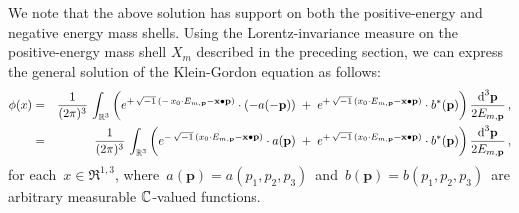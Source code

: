 We note that the above solution has support on {\color{red}both} the positive-energy and negative energy mass shells.
Using the Lorentz-invariance measure on the positive-energy mass shell $X_{m}$ described in the preceding section,
we can express the general solution of the Klein-Gordon equation as follows:
\begin{eqnarray*}
\phi(x)
& = &
	\dfrac{1}{(2\pi)^{3}}\,
	\int_{\Re^{3}} \left(
		e^{+\,\overset{{\color{white}.}}{\sqrt{-1}}\,
			({\color{red}-}\,x_{0} \cdot E_{m,\mathbf{p}} - \mathbf{x} \bullet \mathbf{p})
			}
		\cdot
		(-a(-\mathbf{p}))
		\; + \;
		e^{+\,\overset{{\color{white}.}}{\sqrt{-1}}\,
			(x_{0} \cdot E_{m,\mathbf{p}} - \mathbf{x} \bullet \mathbf{p})
			}
		\cdot
		b^{*}(\mathbf{p})
		\right)
		\dfrac{\d^{3}\mathbf{p}}{2 E_{m,\mathbf{p}}}\,,
\\
& = &
	\dfrac{1}{(2\pi)^{3}}\,
	\int_{\Re^{3}} \left(
		e^{{\color{red}-}\,\overset{{\color{white}.}}{\sqrt{-1}}\,
			(x_{0} \cdot E_{m,\mathbf{p}} - \mathbf{x} \bullet \mathbf{p})
			}
		\cdot
		a(\mathbf{p})
		\; + \;
		e^{+\,\overset{{\color{white}.}}{\sqrt{-1}}\,
			(x_{0} \cdot E_{m,\mathbf{p}} - \mathbf{x} \bullet \mathbf{p})
			}
		\cdot
		b^{*}(\mathbf{p})
		\right)
		\dfrac{\d^{3}\mathbf{p}}{2 E_{m,\mathbf{p}}}\,,
\end{eqnarray*}
for each \,$x \in \Re^{1,3}$,
where
\,$a(\mathbf{p}) = a(p_{1},p_{2},p_{3})$\,
and
\,$b(\mathbf{p}) = b(p_{1},p_{2},p_{3})$\,
are arbitrary measurable $\mathbb{C}$-valued functions.

